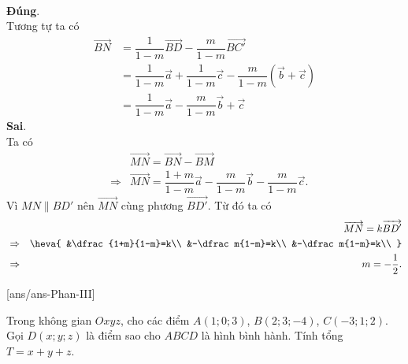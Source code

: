 \begin{ex}
{\begin{itemchoice}
\begin{eqnarray*}
 \end{eqnarray*}
 \itemch \textbf{Đúng}.\\
 Tương tự ta có
 \allowdisplaybreaks
 \begin{align*}
 \overrightarrow{BN}&=\dfrac1{1-m}\overrightarrow{BD}-\dfrac m{1-m}\overrightarrow{BC'}\\
 &=\dfrac1{1-m}\overrightarrow a+\dfrac1{1-m}\overrightarrow c-\dfrac m{1-m}(\overrightarrow b+\overrightarrow c)\\
 &=\dfrac1{1-m}\overrightarrow a-\dfrac m{1-m}\overrightarrow b+\overrightarrow c
 \end{align*}
 \itemch \textbf{Sai}.\\
 Ta có
 \allowdisplaybreaks
 \begin{eqnarray*}
 &&\overrightarrow{MN}=\overrightarrow{BN}-\overrightarrow{BM}\\
 &\Rightarrow&\overrightarrow{MN}=\dfrac{1+m}{1-m}\overrightarrow a-\dfrac m{1-m}\overrightarrow b-\dfrac m{1-m}\overrightarrow c.
 \end{eqnarray*}
 Vì $MN\parallel BD'$ nên $\overrightarrow{MN}$ cùng phương $\overrightarrow{BD'}$. Từ đó ta có
 \allowdisplaybreaks
 \begin{eqnarray*}
 &&\overrightarrow{MN}=k\overrightarrow{BD'}\\
 &\Rightarrow&\heva{
 &\dfrac{1+m}{1-m}=k\\
 &-\dfrac m{1-m}=k\\
 &-\dfrac m{1-m}=k\\
 }\\
 &\Rightarrow&m=-\dfrac12.
 \end{eqnarray*}
 \end{itemchoice}
}\end{ex}

\TNSA
{}[ans/ans\currfilebase-Phan-III]
\begin{ex}%
 Trong không gian $Oxyz$, cho các điểm $A(1;0;3)$, $B(2;3;-4)$, $C(-3;1;2)$. Gọi $D(x;y;z)$ là điểm sao cho $ABCD$ là hình bình hành. Tính tổng $T=x+y+z$.
 \end{ex}


